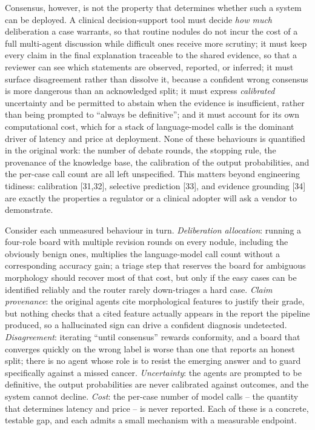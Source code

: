 \documentclass[12pt]{article}
\begin{document}
Consensus, however, is not the property that determines whether such a system can be deployed. A clinical decision-support tool must decide \emph{how much} deliberation a case warrants, so that routine nodules do not incur the cost of a full multi-agent discussion while difficult ones receive more scrutiny; it must keep every claim in the final explanation traceable to the shared evidence, so that a reviewer can see which statements are observed, reported, or inferred; it must surface disagreement rather than dissolve it, because a confident wrong consensus is more dangerous than an acknowledged split; it must express \emph{calibrated} uncertainty and be permitted to abstain when the evidence is insufficient, rather than being prompted to \enquote{always be definitive}; and it must account for its own computational cost, which for a stack of language-model calls is the dominant driver of latency and price at deployment. None of these behaviours is quantified in the original work: the number of debate rounds, the stopping rule, the provenance of the knowledge base, the calibration of the output probabilities, and the per-case call count are all left unspecified. This matters beyond engineering tidiness: calibration [31,32], selective prediction [33], and evidence grounding [34] are exactly the properties a regulator or a clinical adopter will ask a vendor to demonstrate.


Consider each unmeasured behaviour in turn. \emph{Deliberation allocation}: running a four-role board with multiple revision rounds on every nodule, including the obviously benign ones, multiplies the language-model call count without a corresponding accuracy gain; a triage step that reserves the board for ambiguous morphology should recover most of that cost, but only if the easy cases can be identified reliably and the router rarely down-triages a hard case. \emph{Claim provenance}: the original agents cite morphological features to justify their grade, but nothing checks that a cited feature actually appears in the report the pipeline produced, so a hallucinated sign can drive a confident diagnosis undetected. \emph{Disagreement}: iterating \enquote{until consensus} rewards conformity, and a board that converges quickly on the wrong label is worse than one that reports an honest split; there is no agent whose role is to resist the emerging answer and to guard specifically against a missed cancer. \emph{Uncertainty}: the agents are prompted to be definitive, the output probabilities are never calibrated against outcomes, and the system cannot decline. \emph{Cost}: the per-case number of model calls -- the quantity that determines latency and price -- is never reported. Each of these is a concrete, testable gap, and each admits a small mechanism with a measurable endpoint.
\end{document}
